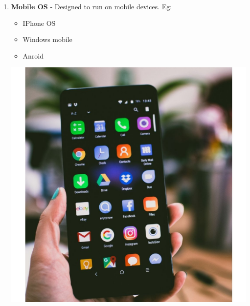 \begin{flushleft}
\begin{enumerate}
		\item 
		\begin{multicols}{2}
			\textbf{Mobile OS} - Designed to run on mobile devices.
			\newline
			Eg:
			\begin{itemize}
				\item IPhone OS
				\item Windows mobile
				\item Anroid
			\end{itemize}
			\vfill \null			
			\columnbreak
			\includegraphics[scale=.12]{content/chapter1/images/mobile.jpg}
		\end{multicols}
		\vspace{-25pt}

	\end{enumerate}
\end{flushleft}

\newpage

